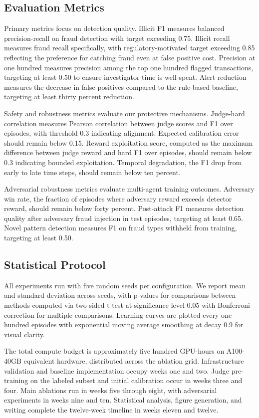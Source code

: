 \documentclass[11pt,a4paper]{article}
\begin{document}
\subsection{Evaluation Metrics}

Primary metrics focus on detection quality. Illicit F1 measures balanced precision-recall on fraud detection with target exceeding 0.75. Illicit recall measures fraud recall specifically, with regulatory-motivated target exceeding 0.85 reflecting the preference for catching fraud even at false positive cost. Precision at one hundred measures precision among the top one hundred flagged transactions, targeting at least 0.50 to ensure investigator time is well-spent. Alert reduction measures the decrease in false positives compared to the rule-based baseline, targeting at least thirty percent reduction.

Safety and robustness metrics evaluate our protective mechanisms. Judge-hard correlation measures Pearson correlation between judge scores and F1 over episodes, with threshold 0.3 indicating alignment. Expected calibration error should remain below 0.15. Reward exploitation score, computed as the maximum difference between judge reward and hard F1 over episodes, should remain below 0.3 indicating bounded exploitation. Temporal degradation, the F1 drop from early to late time steps, should remain below ten percent.

Adversarial robustness metrics evaluate multi-agent training outcomes. Adversary win rate, the fraction of episodes where adversary reward exceeds detector reward, should remain below forty percent. Post-attack F1 measures detection quality after adversary fraud injection in test episodes, targeting at least 0.65. Novel pattern detection measures F1 on fraud types withheld from training, targeting at least 0.50.

\subsection{Statistical Protocol}

All experiments run with five random seeds per configuration. We report mean and standard deviation across seeds, with p-values for comparisons between methods computed via two-sided t-test at significance level 0.05 with Bonferroni correction for multiple comparisons. Learning curves are plotted every one hundred episodes with exponential moving average smoothing at decay 0.9 for visual clarity.

The total compute budget is approximately five hundred GPU-hours on A100-40GB equivalent hardware, distributed across the ablation grid. Infrastructure validation and baseline implementation occupy weeks one and two. Judge pre-training on the labeled subset and initial calibration occur in weeks three and four. Main ablations run in weeks five through eight, with adversarial experiments in weeks nine and ten. Statistical analysis, figure generation, and writing complete the twelve-week timeline in weeks eleven and twelve.
\end{document}
